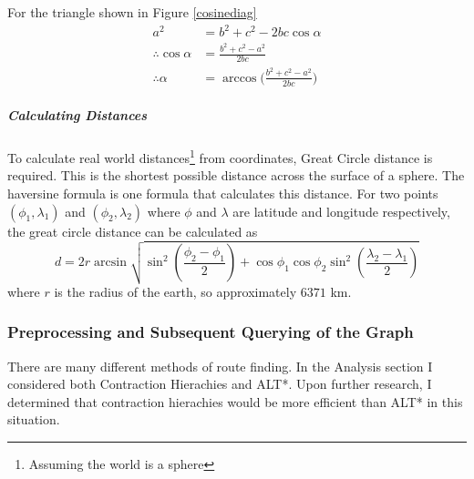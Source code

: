 \documentclass[11pt,twoside,a4paper]{article}
\begin{document}
For the triangle shown in Figure \ref{cosinediag}
\begin{align*}
a^2 &= b^2 + c^2 - 2bc\cos{\alpha}\\
\therefore \cos{\alpha} &= \frac{b^2+c^2-a^2}{2bc}\\
\therefore \alpha &= \arccos{(\frac{b^2+c^2-a^2}{2bc}})
\end{align*}
\subparagraph{Calculating Distances}
To calculate real world distances\footnote{Assuming the world is a sphere} from coordinates, Great Circle distance is required. This is the shortest possible distance across the surface of a sphere. The haversine formula\cite{de1795memoria} is one formula that calculates this distance.
For two points $(\phi_1,\lambda_1)$ and $(\phi_2,\lambda_2)$ where $\phi$ and $\lambda$ are latitude and longitude respectively, the great circle distance can be calculated as
\[
d = 2r\arcsin\sqrt{\sin^2{(\frac{\phi_2-\phi_1}{2})}+\cos{\phi_1}\cos{\phi_2}\sin^2{(\frac{\lambda_2-\lambda_1}{2})}}
\]
where $r$ is the radius of the earth, so approximately $6371$ km.
\subsubsection{Preprocessing and Subsequent Querying of the Graph}
\label{contractiondesign}
There are many different methods of route finding\cite{travelplannervideo}. In the Analysis section I considered both Contraction Hierachies\cite{Geisberger2012} and ALT*. Upon further research, I determined that contraction hierachies would be more
efficient than ALT* in this situation. 
\end{document}
